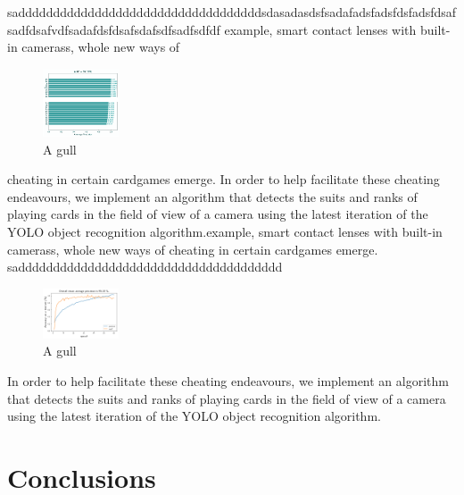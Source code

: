 \documentclass[a0,landscape]{a0poster}
\begin{document}
\begin{multicols}{3}
sadddddddddddddddddddddddddddddddddddsdasadasdsfsadafadsfadsfdsfadsfdsafsadfdsafvdfsadafdsfdsafsdafsdfsadfsdfdf
example, smart contact lenses with built-in camerass, whole new ways of \begin{figure}
  \begin{center}
    \includegraphics[width=0.2\textwidth]{mAP}
  \end{center}
  \caption{A gull}
\end{figure}
cheating in certain cardgames emerge. In order to help facilitate these 
cheating endeavours, we implement an algorithm that detects the suits and ranks of playing cards in the field of view of a camera using the latest iteration of the YOLO object recognition algorithm.example, smart contact lenses with built-in camerass, whole new ways of cheating in certain cardgames emerge. 
sadddddddddddddddddddddddddddddddddddddd
\begin{figure}
  \begin{center}
    \includegraphics[width=0.2\textwidth]{traindev}
  \end{center}
  \caption{A gull}
\end{figure}
In order to help facilitate these cheating endeavours, we implement an algorithm that detects the suits and ranks of playing cards in the field of view of a camera using the latest iteration of the YOLO object recognition algorithm.






\color{SaddleBrown} %

\section*{Conclusions}


\end{multicols}
\end{document}
